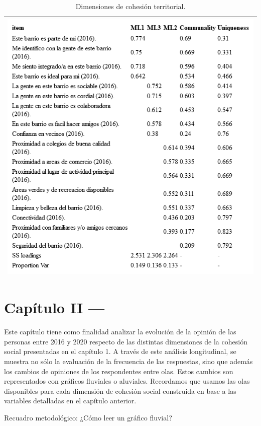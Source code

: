 \documentclass[
  12pt,
]{book}
\begin{document}
\begin{longtable}[]{@{}l@{}}
\caption{\label{tab:cohesion-territorial-fa}Dimensiones de cohesión territorial.}\tabularnewline
\toprule
\endhead
\includegraphics[width=8.33333in,height=\textheight]{output/tables/cohesion_territorial_fa.png}\tabularnewline
\bottomrule
\end{longtable}

\hypertarget{capuxedtulo-ii}{%
\chapter{Capítulo II ---}\label{capuxedtulo-ii}}

Este capítulo tiene como finalidad analizar la evolución de la opinión de las personas entre 2016 y 2020 respecto de las distintas dimensiones de la cohesión social presentadas en el capítulo 1. A través de este análisis longitudinal, se muestra no sólo la evaluación de la frecuencia de las respuestas, sino que además los cambios de opiniones de los respondentes entre olas. Estos cambios son representados con gráficos fluviales o aluviales. Recordamos que usamos las olas disponibles para cada dimensión de cohesión social construida en base a las variables detalladas en el capítulo anterior.

Recuadro metodológico: ¿Cómo leer un gráfico fluvial?
\end{document}
